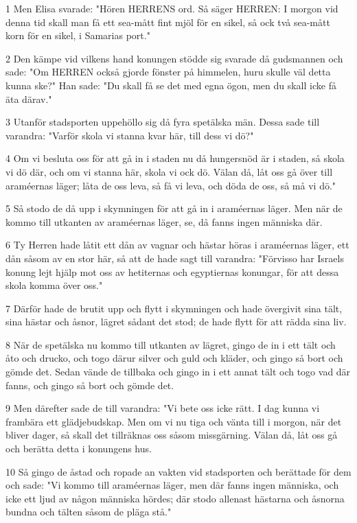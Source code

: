 \par 1 Men Elisa svarade: "Hören HERRENS ord. Så säger HERREN: I morgon vid denna tid skall man få ett sea-mått fint mjöl för en sikel, så ock två sea-mått korn för en sikel, i Samarias port."
\par 2 Den kämpe vid vilkens hand konungen stödde sig svarade då gudsmannen och sade: "Om HERREN också gjorde fönster på himmelen, huru skulle väl detta kunna ske?" Han sade: "Du skall få se det med egna ögon, men du skall icke få äta därav."
\par 3 Utanför stadsporten uppehöllo sig då fyra spetälska män. Dessa sade till varandra: "Varför skola vi stanna kvar här, till dess vi dö?"
\par 4 Om vi besluta oss för att gå in i staden nu då hungersnöd är i staden, så skola vi dö där, och om vi stanna här, skola vi ock dö. Välan då, låt oss gå över till araméernas läger; låta de oss leva, så få vi leva, och döda de oss, så må vi dö."
\par 5 Så stodo de då upp i skymningen för att gå in i araméernas läger. Men när de kommo till utkanten av araméernas läger, se, då fanns ingen människa där.
\par 6 Ty Herren hade låtit ett dån av vagnar och hästar höras i araméernas läger, ett dån såsom av en stor här, så att de hade sagt till varandra: "Förvisso har Israels konung lejt hjälp mot oss av hetiternas och egyptiernas konungar, för att dessa skola komma över oss."
\par 7 Därför hade de brutit upp och flytt i skymningen och hade övergivit sina tält, sina hästar och åsnor, lägret sådant det stod; de hade flytt för att rädda sina liv.
\par 8 När de spetälska nu kommo till utkanten av lägret, gingo de in i ett tält och åto och drucko, och togo därur silver och guld och kläder, och gingo så bort och gömde det. Sedan vände de tillbaka och gingo in i ett annat tält och togo vad där fanns, och gingo så bort och gömde det.
\par 9 Men därefter sade de till varandra: "Vi bete oss icke rätt. I dag kunna vi frambära ett glädjebudskap. Men om vi nu tiga och vänta till i morgon, när det bliver dager, så skall det tillräknas oss såsom missgärning. Välan då, låt oss gå och berätta detta i konungens hus.
\par 10 Så gingo de åstad och ropade an vakten vid stadsporten och berättade för dem och sade: "Vi kommo till araméernas läger, men där fanns ingen människa, och icke ett ljud av någon människa hördes; där stodo allenast hästarna och åsnorna bundna och tälten såsom de pläga stå."

